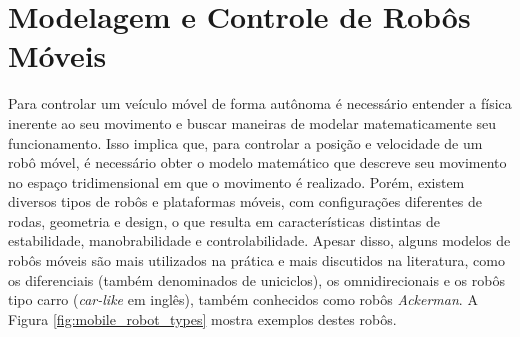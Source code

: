 

\section{Modelagem e Controle de Robôs Móveis}

Para controlar um veículo móvel de forma autônoma é necessário entender a física inerente ao seu movimento e buscar maneiras de modelar matematicamente seu funcionamento. Isso implica que, para controlar a posição e velocidade de um robô móvel, é necessário obter o modelo matemático que descreve seu movimento no espaço tridimensional em que o movimento é realizado. Porém, existem diversos tipos de robôs e plataformas móveis, com configurações diferentes de rodas, geometria e design, o que resulta em características distintas de estabilidade, manobrabilidade e controlabilidade. Apesar disso, alguns modelos de robôs móveis são mais utilizados na prática e mais discutidos na literatura, como os diferenciais (também denominados de uniciclos), os omnidirecionais e os robôs tipo carro (\textit{car-like} em inglês), também conhecidos como robôs \textit{Ackerman}. A Figura \ref{fig:mobile_robot_types} mostra exemplos destes robôs.


